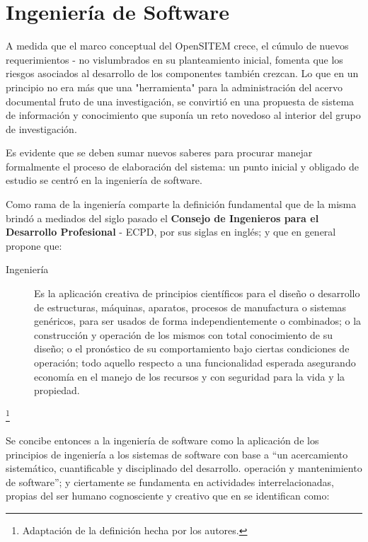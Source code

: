\section{Ingeniería de Software}
A medida que el marco conceptual del OpenSITEM crece, el cúmulo de nuevos requerimientos - no vislumbrados en su planteamiento inicial, fomenta que los riesgos asociados al desarrollo de los componentes también crezcan. Lo que en un principio no era más que una "herramienta" para la administración del acervo documental fruto de una investigación, se convirtió en una propuesta de sistema de información y conocimiento que suponía un reto novedoso al interior del grupo de investigación. 

Es evidente que se deben sumar nuevos saberes para procurar manejar formalmente el proceso de elaboración del sistema: un punto inicial y obligado de estudio se centró en la ingeniería de software. 

Como rama de la ingeniería comparte la definición fundamental que de la misma brindó a mediados del siglo pasado el \textbf{Consejo de Ingenieros para el Desarrollo Profesional} - ECPD, por sus siglas en inglés; y que en general propone que: \begin{description}
\item[Ingeniería]
Es la aplicación creativa de principios científicos para el diseño o desarrollo de estructuras, máquinas, aparatos, procesos de manufactura o sistemas genéricos, para ser usados de forma independientemente o combinados; o la construcción y operación de los mismos con total conocimiento de su diseño; o el pronóstico de su comportamiento bajo ciertas condiciones de operación; todo aquello respecto a una funcionalidad esperada asegurando economía en el manejo de los recursos y con seguridad para la vida y la propiedad. \end{description}\footnote{Adaptación de la definición hecha por los autores.}

Se concibe entonces a la ingeniería de software como la aplicación de los principios de ingeniería a los sistemas de software con base a “un acercamiento sistemático, cuantificable y disciplinado del desarrollo. operación y mantenimiento de software”\cite{softwareengineering}; y ciertamente se fundamenta en actividades interrelacionadas, propias del ser humano cognosciente y creativo que en \cite{objectoriented} se identifican como: 

